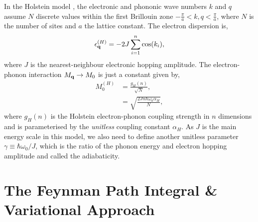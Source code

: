 In the Holstein model \cite{holstein_studies_1959-1, holstein_studies_1959}, the electronic and phononic wave numbers $k$ and $q$ assume $N$ discrete values within the first Brillouin zone $-\frac{\pi}{a} < k, q < \frac{\pi}{a}$, where $N$ is the number of sites and $a$ the lattice constant. The electron dispersion is,
\begin{equation}
    \epsilon^{(H)}_{\vb{q}} = -2 J \sum_{i=1}^n \cos(k_i) ,
\end{equation}
where $J$ is the nearest-neighbour electronic hopping amplitude. The electron-phonon interaction $M_{\vb{q}} \to M_0$ is just a constant given by,
\begin{equation}
    \begin{aligned}
        M^{(H)}_{0} &= \frac{g_{H}(n)}{\sqrt{N}} , \\
        &= \sqrt{\frac{2 J n \hbar \omega_0 \alpha_H}{N}} ,
    \end{aligned}
\end{equation}
where $g_{H}(n)$ is the Holstein electron-phonon coupling strength in $n$ dimensions and is parameterised by the \emph{unitless} coupling constant $\alpha_H$. As $J$ is the main energy scale in this model, we also need to define another unitless parameter $\gamma \equiv \hbar \omega_0 / J$, which is the ratio of the phonon energy and electron hopping amplitude and called the adiabaticity.

\section{The Feynman Path Integral \& Variational Approach}
\label{sec:2-2}

